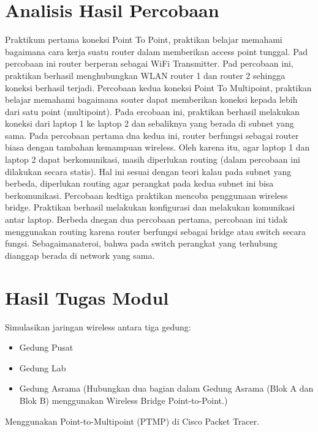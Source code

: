 \section{Analisis Hasil Percobaan}
Praktikum pertama koneksi Point To Point, praktikan belajar memahami bagaimana cara kerja suatu router dalam memberikan access point tunggal. Pad percobaan ini router berperan sebagai WiFi Transmitter. Pad percobaan ini, praktikan berhasil menghubungkan WLAN router 1 dan router 2 sehingga koneksi berhasil terjadi. Percobaan kedua koneksi Point To Multipoint, praktikan belajar memahami bagaimana souter dapat memberikan koneksi kepada lebih dari satu point (multipoint). Pada ercobaan ini, praktikan berhasil melakukan koneksi dari laptop 1 ke laptop 2 dan sebaliknya yang berada  di subnet yang sama. Pada percobaan pertama dna kedua ini, router berfungsi sebagai router biasa dengan tambahan kemampuan wireless. Oleh karena itu, agar laptop 1 dan laptop 2 dapat berkomunikasi, masih diperlukan routing (dalam percobaan ini dilakukan secara statis). Hal ini sesuai dengan teori kalau pada subnet yang berbeda, diperlukan routing agar perangkat pada kedua subnet ini bisa berkomunikasi. Percobaan kedtiga praktikan mencoba penggunaan wireless bridge. Praktikan berhasil melakukan konfigurasi dan melakukan komunikasi antar laptop. Berbeda dnegan dua percobaan pertama, percobaan ini tidak menggunakan routing karena router berfungsi sebagai bridge atau switch secara fungsi. Sebagaimanateroi, bahwa pada switch perangkat yang terhubung dianggap berada di network yang sama.

\section{Hasil Tugas Modul}
Simulasikan jaringan wireless antara tiga gedung:
\begin{itemize}
  \item Gedung Pusat
  \item Gedung Lab
  \item Gedung Asrama (Hubungkan dua bagian dalam Gedung Asrama (Blok A dan Blok B) menggunakan Wireless Bridge Point-to-Point.)
\end{itemize}
Menggunakan Point-to-Multipoint (PTMP) di Cisco Packet Tracer. \\

